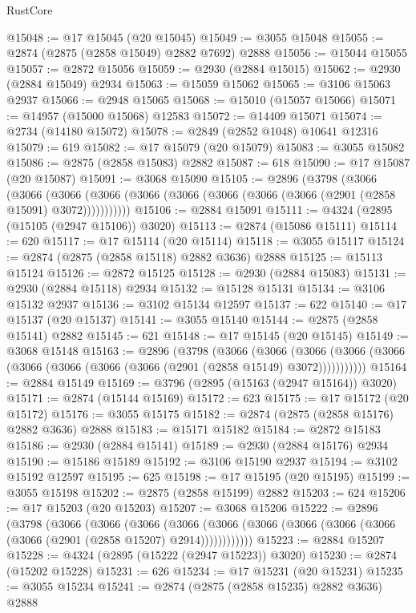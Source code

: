 \begin{lexlean}{RustCore}
\begin{coremodule}
@15048 := @17 @15045 (@20 @15045)
@15049 := @3055 @15048
@15055 := @2874 (@2875 (@2858 @15049) @2882 @7692) @2888
@15056 := @15044 @15055
@15057 := @2872 @15056
@15059 := @2930 (@2884 @15015)
@15062 := @2930 (@2884 @15049) @2934
@15063 := @15059 @15062
@15065 := @3106 @15063 @2937
@15066 := @2948 @15065
@15068 := @15010 (@15057 @15066)
@15071 := @14957 (@15000 @15068) @12583
@15072 := @14409 @15071
@15074 := @2734 (@14180 @15072)
@15078 := @2849 (@2852 @1048) @10641 @12316
@15079 := 619
@15082 := @17 @15079 (@20 @15079)
@15083 := @3055 @15082
@15086 := @2875 (@2858 @15083) @2882
@15087 := 618
@15090 := @17 @15087 (@20 @15087)
@15091 := @3068 @15090
@15105 := @2896
    (@3798
      (@3066
        (@3066
          (@3066 (@3066 (@3066 (@3066 (@3066 (@3066 (@3066 (@2901 (@2858 @15091) @3072)))))))))))
@15106 := @2884 @15091
@15111 := @4324 (@2895 (@15105 (@2947 @15106)) @3020)
@15113 := @2874 (@15086 @15111)
@15114 := 620
@15117 := @17 @15114 (@20 @15114)
@15118 := @3055 @15117
@15124 := @2874 (@2875 (@2858 @15118) @2882 @3636) @2888
@15125 := @15113 @15124
@15126 := @2872 @15125
@15128 := @2930 (@2884 @15083)
@15131 := @2930 (@2884 @15118) @2934
@15132 := @15128 @15131
@15134 := @3106 @15132 @2937
@15136 := @3102 @15134 @12597
@15137 := 622
@15140 := @17 @15137 (@20 @15137)
@15141 := @3055 @15140
@15144 := @2875 (@2858 @15141) @2882
@15145 := 621
@15148 := @17 @15145 (@20 @15145)
@15149 := @3068 @15148
@15163 := @2896
    (@3798
      (@3066
        (@3066
          (@3066 (@3066 (@3066 (@3066 (@3066 (@3066 (@3066 (@2901 (@2858 @15149) @3072)))))))))))
@15164 := @2884 @15149
@15169 := @3796 (@2895 (@15163 (@2947 @15164)) @3020)
@15171 := @2874 (@15144 @15169)
@15172 := 623
@15175 := @17 @15172 (@20 @15172)
@15176 := @3055 @15175
@15182 := @2874 (@2875 (@2858 @15176) @2882 @3636) @2888
@15183 := @15171 @15182
@15184 := @2872 @15183
@15186 := @2930 (@2884 @15141)
@15189 := @2930 (@2884 @15176) @2934
@15190 := @15186 @15189
@15192 := @3106 @15190 @2937
@15194 := @3102 @15192 @12597
@15195 := 625
@15198 := @17 @15195 (@20 @15195)
@15199 := @3055 @15198
@15202 := @2875 (@2858 @15199) @2882
@15203 := 624
@15206 := @17 @15203 (@20 @15203)
@15207 := @3068 @15206
@15222 := @2896
    (@3798
      (@3066
        (@3066
          (@3066
            (@3066 (@3066 (@3066 (@3066 (@3066 (@3066 (@3066 (@2901 (@2858 @15207) @2914))))))))))))
@15223 := @2884 @15207
@15228 := @4324 (@2895 (@15222 (@2947 @15223)) @3020)
@15230 := @2874 (@15202 @15228)
@15231 := 626
@15234 := @17 @15231 (@20 @15231)
@15235 := @3055 @15234
@15241 := @2874 (@2875 (@2858 @15235) @2882 @3636) @2888

\end{coremodule}
\end{lexlean}

